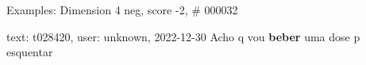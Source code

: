 \begin{frame}{Examples: Dimension 4 neg, score -2, \# 000032}
\footnotesize
\begin{alertblock}{text: t028420, user: unknown, 2022-12-30}
Acho q vou \textbf{beber} uma dose p esquentar \textbf{} 
\end{alertblock}
\end{frame}
